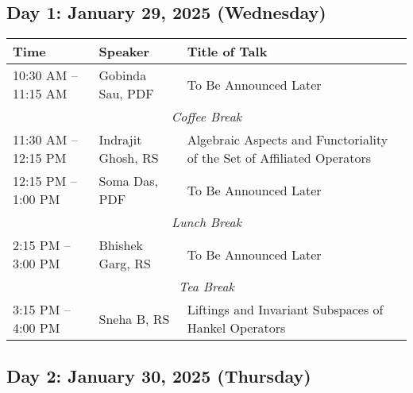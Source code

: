 %
%

\subsection*{Day 1: January 29, 2025 (Wednesday)}

\noindent
\renewcommand{\arraystretch}{1.5} %
\begin{tabular}{|p{3.5cm}|p{4cm}|p{7cm}|}
	\hline
	\textbf{Time} & \textbf{Speaker} & \textbf{Title of Talk} \\
	\hline
	10:30 AM -- 11:15 AM & Gobinda Sau, PDF & To Be Announced Later \\
	\hline
	\multicolumn{3}{|c|}{\textit{Coffee Break}} \\
	\hline
    11:30 AM -- 12:15 PM & Indrajit Ghosh, RS & Algebraic Aspects and Functoriality of the Set of Affiliated Operators \\
	\hline
	12:15 PM -- 1:00 PM & Soma Das, PDF & To Be Announced Later \\
	\hline
	\multicolumn{3}{|c|}{\textit{Lunch Break}} \\
	\hline
	2:15 PM -- 3:00 PM & Bhishek Garg, RS & To Be Announced Later \\
	\hline
	\multicolumn{3}{|c|}{\textit{Tea Break}} \\
	\hline
	3:15 PM -- 4:00 PM & Sneha B, RS & Liftings and Invariant Subspaces of Hankel Operators\\
	\hline

\end{tabular}


\subsection*{Day 2: January 30, 2025 (Thursday)}

